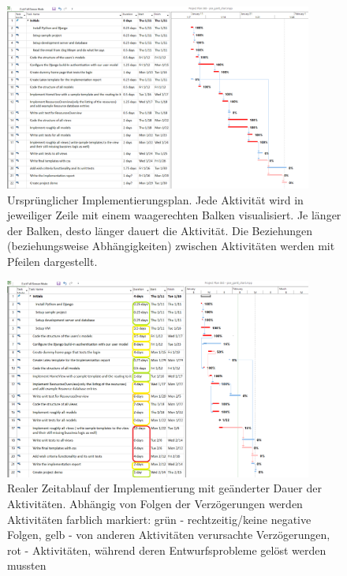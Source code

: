 \documentclass[parskip=full,11pt]{scrartcl}
\begin{document}
 \begin{figure}[ht!]
 	\centering
 	\includegraphics[width=0.9\textwidth]{res/gannt_plan.png}
 	\caption{Ursprünglicher Implementierungsplan. Jede Aktivität wird in jeweiliger Zeile mit einem waagerechten Balken visualisiert. Je länger der Balken, desto länger dauert die Aktivität. Die Beziehungen (beziehungsweise Abhängigkeiten) zwischen Aktivitäten werden mit Pfeilen dargestellt.}
 \end{figure}
  \begin{figure}[ht!]
 	\centering
 	\includegraphics[width=0.9\textwidth]{res/gannt_real.png}
 	\caption{Realer Zeitablauf der Implementierung mit geänderter Dauer der Aktivitäten. Abhängig von Folgen der Verzögerungen werden Aktivitäten farblich markiert: grün - rechtzeitig/keine negative Folgen, gelb - von anderen Aktivitäten verursachte Verzögerungen, rot - Aktivitäten, während deren Entwurfsprobleme gelöst werden mussten}
 \end{figure}
\end{document}
